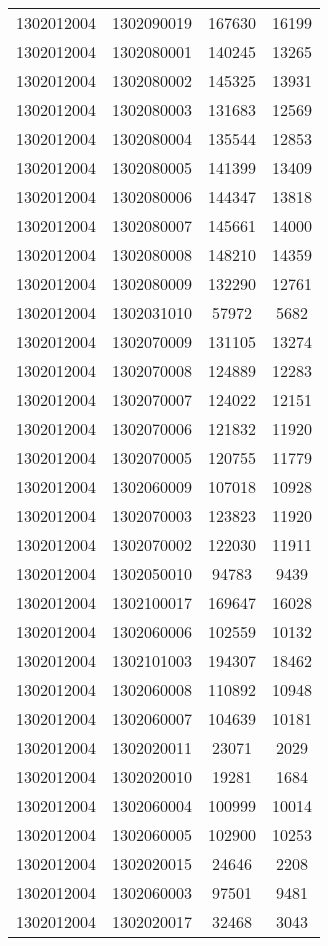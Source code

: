 \begin{longtable}{llcc}
1302012004 & 1302090019 & 167630 & 16199\\
1302012004 & 1302080001 & 140245 & 13265\\
1302012004 & 1302080002 & 145325 & 13931\\
1302012004 & 1302080003 & 131683 & 12569\\
1302012004 & 1302080004 & 135544 & 12853\\
1302012004 & 1302080005 & 141399 & 13409\\
1302012004 & 1302080006 & 144347 & 13818\\
1302012004 & 1302080007 & 145661 & 14000\\
1302012004 & 1302080008 & 148210 & 14359\\
1302012004 & 1302080009 & 132290 & 12761\\
1302012004 & 1302031010 & 57972 & 5682\\
1302012004 & 1302070009 & 131105 & 13274\\
1302012004 & 1302070008 & 124889 & 12283\\
1302012004 & 1302070007 & 124022 & 12151\\
1302012004 & 1302070006 & 121832 & 11920\\
1302012004 & 1302070005 & 120755 & 11779\\
1302012004 & 1302060009 & 107018 & 10928\\
1302012004 & 1302070003 & 123823 & 11920\\
1302012004 & 1302070002 & 122030 & 11911\\
1302012004 & 1302050010 & 94783 & 9439\\
1302012004 & 1302100017 & 169647 & 16028\\
1302012004 & 1302060006 & 102559 & 10132\\
1302012004 & 1302101003 & 194307 & 18462\\
1302012004 & 1302060008 & 110892 & 10948\\
1302012004 & 1302060007 & 104639 & 10181\\
1302012004 & 1302020011 & 23071 & 2029\\
1302012004 & 1302020010 & 19281 & 1684\\
1302012004 & 1302060004 & 100999 & 10014\\
1302012004 & 1302060005 & 102900 & 10253\\
1302012004 & 1302020015 & 24646 & 2208\\
1302012004 & 1302060003 & 97501 & 9481\\
1302012004 & 1302020017 & 32468 & 3043\\

\end{longtable}

